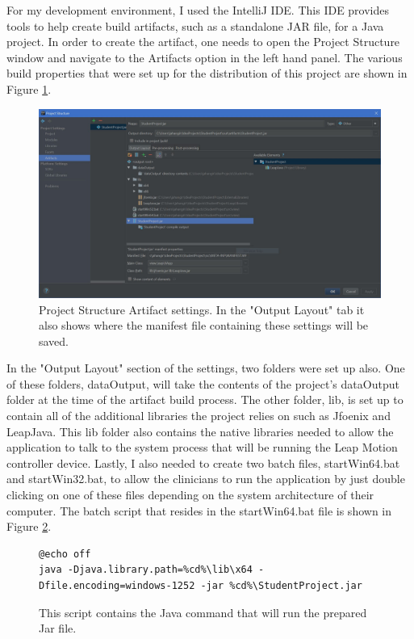 For my development environment, I used the IntelliJ IDE. This IDE provides tools to help create build artifacts, such as a standalone JAR file, for a Java project. In order to create the artifact, one needs to open the Project Structure window and navigate to the Artifacts option in the left hand panel. The various build properties that were set up for the distribution of this project are shown in Figure \ref{fig:artifactBuildSettings}. 
\begin{figure}[H]
\centering
\includegraphics[scale=0.45]{Figures/6_ide_buildArtifact.JPG}
\caption[Build Project Artifact]{Project Structure Artifact settings. In the "Output Layout" tab it also shows where the manifest file containing these settings will be saved.}
\label{fig:artifactBuildSettings}
\end{figure}
In the "Output Layout" section of the settings, two folders were set up also. One of these folders, dataOutput, will take the contents of the project's dataOutput folder at the time of the artifact build process. The other folder, lib, is set up to contain all of the additional libraries the project relies on such as Jfoenix and LeapJava. This lib folder also contains the native libraries needed to allow the application to talk to the system process that will be running the Leap Motion controller device. Lastly, I also needed to create two batch files, startWin64.bat and startWin32.bat, to allow the clinicians to run the application by just double clicking on one of these files depending on the system architecture of their computer. The batch script that resides in the startWin64.bat file is shown in Figure \ref{fig:batchScript}. 
\begin{figure}[H]
\centering
\begin{lstlisting}
@echo off
java -Djava.library.path=%cd%\lib\x64 -Dfile.encoding=windows-1252 -jar %cd%\StudentProject.jar
\end{lstlisting}
\caption[Application Batch Script]{This script contains the Java command that will run the prepared Jar file.}
\label{fig:batchScript}
\end{figure}
